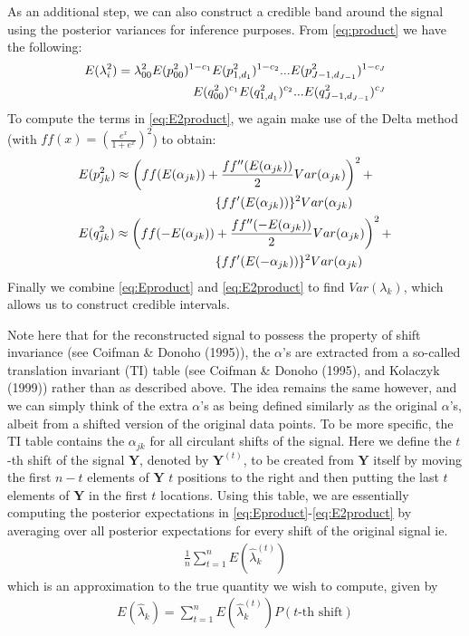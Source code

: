 \documentclass[12pt]{article}
\newcommand{\Ga}{\alpha}
\newcommand{\Gl}{\lambda}    \newcommand{\GL}{\Lambda}
\begin{document}
\begin{appendices}
As an additional step, we can also construct a credible band around the signal using the posterior variances for inference purposes. From \eqref{eq:product} we have the following:
\begin{eqnarray}\label{eq:E2product}E(\Gl_i^2)=\Gl_{00}^2E(p_{00}^2)^{1-c_1}E(p_{1,d_1}^2)^{1-c_2}...E(p_{J-1,d_{J-1}}^2)^{1-c_J}\notag\\
E(q_{00}^2)^{c_1}E(q_{1,d_1}^2)^{c_2}...E(q_{J-1,d_{J-1}}^2)^{c_J}\end{eqnarray}
To compute the terms in \eqref{eq:E2product}, we again make use of the Delta method (with $ff(x)=(\frac{e^x}{1+e^x})^2$) to obtain:
\begin{eqnarray}
&E(p_{jk}^2)\approx \left(ff(E(\Ga_{jk}))+\frac{ff''(E(\Ga_{jk}))}{2}Var(\Ga_{jk})\right)^2+\notag\\
& \hspace{1.5 in}\{ff'(E(\Ga_{jk}))\}^2Var(\Ga_{jk})\\
&E(q_{jk}^2)\approx \left(ff(-E(\Ga_{jk}))+\frac{ff''(-E(\Ga_{jk}))}{2}Var(\Ga_{jk})\right)^2+\notag\\
& \hspace{1.5 in}\{ff'(E(-\Ga_{jk}))\}^2Var(\Ga_{jk})
\end{eqnarray}
Finally we combine \eqref{eq:Eproduct} and \eqref{eq:E2product} to find $Var(\Gl_k)$, which allows us to construct credible intervals.

Note here that for the reconstructed signal to possess the property of shift invariance (see Coifman \& Donoho (1995)), the $\Ga$'s are extracted from a so-called translation invariant (TI) table (see Coifman \& Donoho (1995), and Kolaczyk (1999)) rather than as described above. The idea remains the same however, and we can simply think of the extra $\Ga$'s as being defined similarly as the original $\Ga$'s, albeit from a shifted version of the original data points. To be more specific, the TI table contains the $\Ga_{jk}$ for all circulant shifts of the signal. Here we define the $t$-th shift of the signal $\bm{Y}$, denoted by $\bm{Y}^{(t)}$, to be created from $\bm{Y}$ itself by moving the first $n-t$ elements of $\bm{Y}$ $t$ positions to the right and then putting the last $t$ elements of $\bm{Y}$ in the first $t$ locations. Using this table, we are essentially computing the posterior expectations in \eqref{eq:Eproduct}-\eqref{eq:E2product} by averaging over all posterior expectations for every shift of the original signal ie.
\begin{eqnarray}
\label{eq:TIapproxexp}\frac{1}{n}\sum_{t=1}^n E(\hat{\Gl}_k^{(t)})
\end{eqnarray}
which is an approximation to the true quantity we wish to compute, given by
\begin{eqnarray}
E(\hat{\Gl}_k)=\sum_{t=1}^n E(\hat{\Gl}_k^{(t)})P(\mbox{$t$-th shift})
\end{eqnarray}
\end{appendices}
\end{document}
